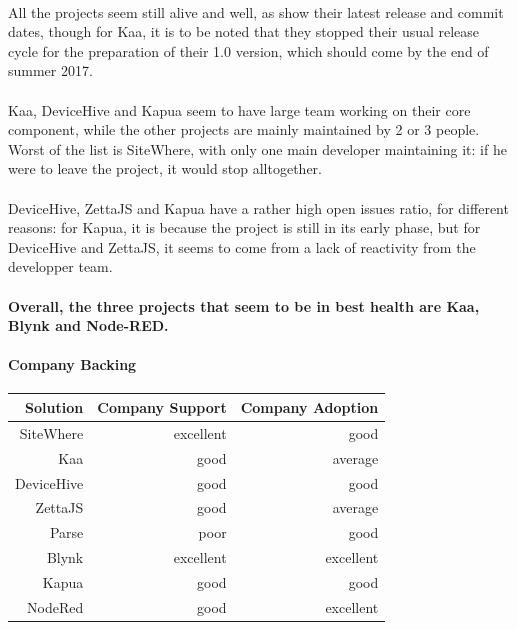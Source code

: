 \documentclass{article}
\begin{document}
\paragraph{} All the projects seem still alive and well, as show their latest release and commit dates, though for Kaa, it is to be noted that they stopped their usual release cycle for the preparation of their 1.0 version, which should come by the end of summer 2017.

\paragraph{} Kaa, DeviceHive and Kapua seem to have large team working on their core component, while the other projects are mainly maintained by 2 or 3 people. Worst of the list is SiteWhere, with only one main developer maintaining it: if he were to leave the project, it would stop alltogether.

\paragraph{} DeviceHive, ZettaJS and Kapua have a rather high open issues ratio, for different reasons: for Kapua, it is because the project is still in its early phase, but for DeviceHive and ZettaJS, it seems to come from a lack of reactivity from the developper team.

\paragraph{} \textbf{Overall, the three projects that seem to be in best health are Kaa, Blynk and Node-RED.}

\newpage

\paragraph{Company Backing}

\begin{center}
\begin{tabular}{r|r|r}
Solution & Company Support & Company Adoption \\ \hline
SiteWhere & \cellcolor{green!25}excellent & \cellcolor{blue!10}good \\
Kaa & \cellcolor{blue!10}good & \cellcolor{yellow!25}average \\
DeviceHive & \cellcolor{blue!10}good & \cellcolor{blue!10}good \\
ZettaJS & \cellcolor{blue!10}good & \cellcolor{yellow!25}average \\
Parse & \cellcolor{orange!25}poor & \cellcolor{blue!10}good \\
Blynk & \cellcolor{green!25}excellent & \cellcolor{green!25}excellent \\
Kapua & \cellcolor{blue!10}good & \cellcolor{blue!10}good \\
NodeRed & \cellcolor{blue!10}good & \cellcolor{green!25}excellent \\
\end{tabular}
\end{center}
\end{document}
